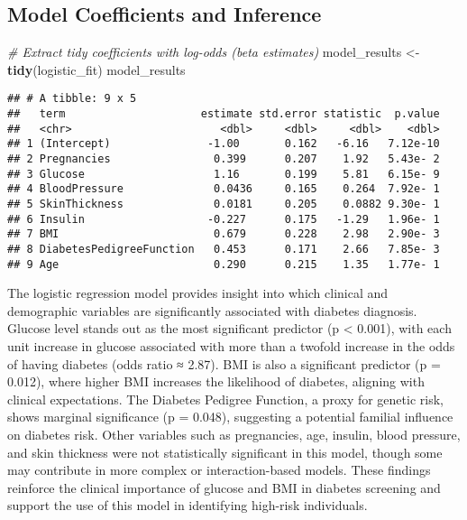 \documentclass[
]{article}
\newenvironment{Shaded}{\begin{snugshade}}{\end{snugshade}}
\newcommand{\CommentTok}[1]{\textcolor[rgb]{0.56,0.35,0.01}{\textit{#1}}}
\newcommand{\FunctionTok}[1]{\textcolor[rgb]{0.13,0.29,0.53}{\textbf{#1}}}
\newcommand{\NormalTok}[1]{#1}
\newcommand{\OtherTok}[1]{\textcolor[rgb]{0.56,0.35,0.01}{#1}}
\begin{document}
\subsection{Model Coefficients and
Inference}\label{model-coefficients-and-inference}

\begin{Shaded}
\begin{Highlighting}[]
\CommentTok{\# Extract tidy coefficients with log{-}odds (beta estimates)}
\NormalTok{model\_results }\OtherTok{\textless{}{-}} \FunctionTok{tidy}\NormalTok{(logistic\_fit)}
\NormalTok{model\_results}
\end{Highlighting}
\end{Shaded}

\begin{verbatim}
## # A tibble: 9 x 5
##   term                     estimate std.error statistic  p.value
##   <chr>                       <dbl>     <dbl>     <dbl>    <dbl>
## 1 (Intercept)               -1.00       0.162   -6.16   7.12e-10
## 2 Pregnancies                0.399      0.207    1.92   5.43e- 2
## 3 Glucose                    1.16       0.199    5.81   6.15e- 9
## 4 BloodPressure              0.0436     0.165    0.264  7.92e- 1
## 5 SkinThickness              0.0181     0.205    0.0882 9.30e- 1
## 6 Insulin                   -0.227      0.175   -1.29   1.96e- 1
## 7 BMI                        0.679      0.228    2.98   2.90e- 3
## 8 DiabetesPedigreeFunction   0.453      0.171    2.66   7.85e- 3
## 9 Age                        0.290      0.215    1.35   1.77e- 1
\end{verbatim}

The logistic regression model provides insight into which clinical and
demographic variables are significantly associated with diabetes
diagnosis. Glucose level stands out as the most significant predictor (p
\textless{} 0.001), with each unit increase in glucose associated with
more than a twofold increase in the odds of having diabetes (odds ratio
≈ 2.87). BMI is also a significant predictor (p = 0.012), where higher
BMI increases the likelihood of diabetes, aligning with clinical
expectations. The Diabetes Pedigree Function, a proxy for genetic risk,
shows marginal significance (p = 0.048), suggesting a potential familial
influence on diabetes risk. Other variables such as pregnancies, age,
insulin, blood pressure, and skin thickness were not statistically
significant in this model, though some may contribute in more complex or
interaction-based models. These findings reinforce the clinical
importance of glucose and BMI in diabetes screening and support the use
of this model in identifying high-risk individuals.
\end{document}
